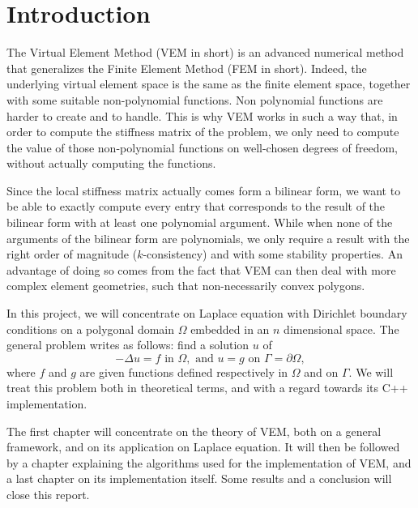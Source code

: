 \newpage
\section*{Introduction} 

The Virtual Element Method (VEM in short) is an advanced numerical method that generalizes the Finite Element Method (FEM in short). Indeed, the underlying virtual element space is the same as the finite element space, together with some suitable non-polynomial functions. Non polynomial functions are harder to create and to handle. This is why VEM works in such a way that, in order to compute the stiffness matrix of the problem, we only need to compute the value of those non-polynomial functions on well-chosen degrees of freedom, without actually computing the functions. 

Since the local stiffness matrix actually comes form a bilinear form, we want to be able to exactly compute every entry that corresponds to the result of the bilinear form with at least one polynomial argument. While when none of the arguments of the bilinear form are polynomials, we only require a result with the right order of magnitude ($k$-consistency) and with some stability properties. An advantage of doing so comes from the fact that VEM can then deal with more complex element geometries, such that non-necessarily convex polygons.\newline 

In this project, we will concentrate on Laplace equation with Dirichlet boundary conditions on a polygonal domain $\Omega$ embedded in an $n$ dimensional space. The general problem writes as follows: find a solution $u$ of
$$ -\Delta u = f \text{ in } \Omega, \text{ and } u = g \text{ on } \Gamma = \partial \Omega, $$
where $f$ and $g$ are given functions defined respectively in $\Omega$ and on $\Gamma$.
We will treat this problem both in theoretical terms, and with a regard towards its C++ implementation. \newline

The first chapter will concentrate on the theory of VEM, both on a general framework, and on its application on Laplace equation. It will then be followed by a chapter explaining the algorithms used for the implementation of VEM, and a last chapter on its implementation itself. Some results and a conclusion will close this report. 


